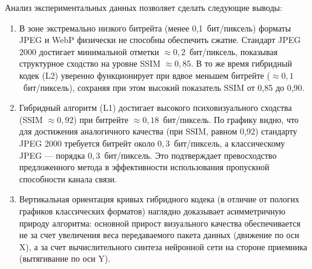 Анализ экспериментальных данных позволяет сделать следующие выводы:
\begin{enumerate}
    \item В зоне экстремально низкого битрейта (менее 0,1~бит/пиксель) форматы JPEG и WebP физически не способны обеспечить сжатие. Стандарт JPEG 2000 достигает минимальной отметки $\approx 0,2$~бит/пиксель, показывая структурное сходство на уровне SSIM $\approx 0,85$. В то же время гибридный кодек (L2) уверенно функционирует при вдвое меньшем битрейте ($\approx 0,1$~бит/пиксель), сохраняя при этом высокий показатель SSIM от 0,85 до 0,90.
    \item Гибридный алгоритм (L1) достигает высокого психовизуального сходства (SSIM $\approx 0,92$) при битрейте $\approx 0,18$~бит/пиксель. По графику видно, что для достижения аналогичного качества (при SSIM, равном 0,92) стандарту JPEG 2000 требуется битрейт около $0,3$~бит/пиксель, а классическому JPEG --- порядка $0,3$~бит/пиксель. Это подтверждает превосходство предложенного метода в эффективности использования пропускной способности канала связи.
    \item Вертикальная ориентация кривых гибридного кодека (в отличие от пологих графиков классических форматов) наглядно доказывает асимметричную природу алгоритма: основной прирост визуального качества обеспечивается не за счет увеличения веса передаваемого пакета данных (движение по оси X), а за счет вычислительного синтеза нейронной сети на стороне приемника (вытягивание по оси Y).
\end{enumerate}